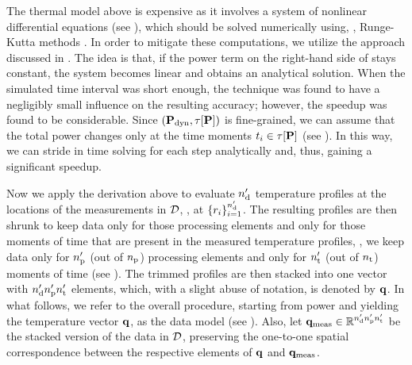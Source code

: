



The thermal model above is expensive as it involves a system of nonlinear differential equations (see ), which should be solved numerically using, \eg, Runge-Kutta methods \cite{press2007}. In order to mitigate these computations, we utilize the approach discussed in \cite{ukhov2012}.
The idea is that, if the power term on the right-hand side of  stays constant, the system becomes linear and obtains an analytical solution. When the simulated time interval was short enough, the technique was found to have a negligibly small influence on the resulting accuracy; however, the speedup was found to be considerable.
Since $(\mathbf{P}_{\text{dyn}}, \tau[\mathbf{P}])$ is fine-grained, we can assume that the total power changes only at the time moments $t_i \in \tau[\mathbf{P}]$ (see ). In this way, we can stride in time solving  for each step analytically and, thus, gaining a significant speedup.

Now we apply the derivation above to evaluate ${n_\text{d}'}$ temperature profiles at the locations of the measurements in $\mathcal{D}$, \ie, at $\{ r_i \}_{i = 1}^{n_\text{d}'}$.
The resulting profiles are then shrunk to keep data only for those processing elements and only for those moments of time that are present in the measured temperature profiles, \ie, we keep data only for ${n_\text{p}'}$ (out of ${n_\text{p}}$) processing elements and only for ${n_\text{t}'}$ (out of ${n_\text{t}}$) moments of time (see ).
The trimmed profiles are then stacked into one vector with ${n_\text{d}'} {n_\text{p}'} {n_\text{t}'}$ elements, which, with a slight abuse of notation, is denoted by $\mathbf{q}$.
In what follows, we refer to the overall procedure, starting from power and yielding the temperature vector $\mathbf{q}$, as the data model (see ).
Also, let $\mathbf{q}_{\text{meas}} \in \mathbb{R}^{{n_\text{d}'} {n_\text{p}'} {n_\text{t}'}}$ be the stacked version of the data in $\mathcal{D}$, preserving the one-to-one spatial correspondence between the respective elements of $\mathbf{q}$ and $\mathbf{q}_{\text{meas}}$.
